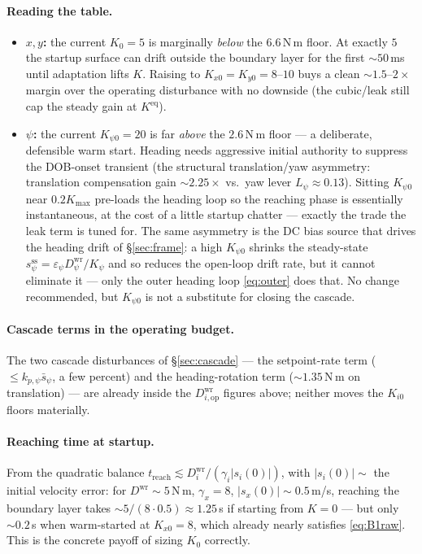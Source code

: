 \documentclass[11pt]{article}
\theoremstyle{plain}
\theoremstyle{definition}
\newcommand{\Dwr}{D^{\mathrm{wr}}}
\newcommand{\Kmax}{K_{\max}}
\begin{document}
\paragraph{Reading the table.}
\begin{itemize}[leftmargin=1.5em]
\item \textbf{$x,y$:} the current $K_{0}=5$ is marginally \emph{below} the
$6.6\,$N\,m floor. At exactly $5$ the startup surface can drift outside the boundary
layer for the first ${\sim}50\,$ms until adaptation lifts $K$. Raising to
$K_{x0}=K_{y0}=8$--$10$ buys a clean ${\sim}1.5$--$2\times$ margin over the operating
disturbance with no downside (the cubic/leak still cap the steady gain at
$K^{\mathrm{eq}}$).
\item \textbf{$\psi$:} the current $K_{\psi0}=20$ is far \emph{above} the $2.6\,$N\,m
floor --- a deliberate, defensible warm start. Heading needs aggressive initial
authority to suppress the DOB-onset transient (the structural translation/yaw
asymmetry: translation compensation gain ${\sim}2.25\times$ vs.\ yaw lever
$L_\psi\approx0.13$). Sitting $K_{\psi0}$ near $0.2\Kmax$ pre-loads the heading loop so
the reaching phase is essentially instantaneous, at the cost of a little startup
chatter --- exactly the trade the leak term is tuned for. The same asymmetry is the DC
bias source that drives the heading drift of \S\ref{sec:frame}: a high $K_{\psi0}$
shrinks the steady-state $s_\psi^{\mathrm{ss}}=\varepsilon_\psi\Dwr_\psi/K_\psi$ and so
reduces the open-loop drift rate, but it cannot eliminate it --- only the outer heading
loop \eqref{eq:outer} does that. No change recommended, but $K_{\psi0}$ is not a
substitute for closing the cascade.
\end{itemize}

\paragraph{Cascade terms in the operating budget.} The two cascade disturbances of
\S\ref{sec:cascade} --- the setpoint-rate term ($\le k_{p,\psi}\bar s_\psi$, a few
percent) and the heading-rotation term (${\sim}1.35\,$N\,m on translation) --- are
already inside the $\Dwr_{i,\mathrm{op}}$ figures above; neither moves the $K_{i0}$
floors materially.

\paragraph{Reaching time at startup.} From the quadratic balance
$t_{\mathrm{reach}}\lesssim \Dwr_i/(\gamma_i|s_i(0)|)$, with $|s_i(0)|\sim$ the initial
velocity error: for $\Dwr\sim5\,$N\,m, $\gamma_x=8$, $|s_x(0)|\sim0.5\,$m/s, reaching
the boundary layer takes ${\sim}5/(8\cdot0.5)\approx1.25\,$s if starting from
$K=0$ --- but only ${\sim}0.2\,$s when warm-started at $K_{x0}=8$, which already nearly
satisfies \eqref{eq:B1raw}. This is the concrete payoff of sizing $K_{0}$ correctly.
\end{document}

